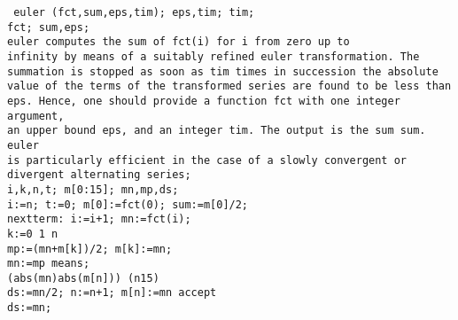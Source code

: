 \documentclass[a4paper,11pt]{article}
\begin{document}
\begin{flushleft}
\texttt{ euler (fct,sum,eps,tim);  eps,tim;  tim;\\
  fct;  sum,eps;\\
 euler computes the sum of fct(i) for i from zero up to\\
infinity by means of a suitably refined euler transformation. The\\
summation is stopped as soon as tim times in succession the absolute\\
value of the terms of the transformed series are found to be less than\\
eps. Hence, one should provide a function fct with one integer argument,\\
an upper bound eps, and an integer tim. The output is the sum sum. euler\\
is particularly efficient in the case of a slowly convergent or\\
divergent alternating series;\\
  i,k,n,t;  m[0:15];  mn,mp,ds;\\
i:=n; t:=0; m[0]:=fct(0); sum:=m[0]/2;\\
nextterm: i:=i+1; mn:=fct(i);\\
\hspace{1.0cm} k:=0  1  n \\
\hspace{1.0cm}\hspace{1.0cm}\hspace{1.0cm} mp:=(mn+m[k])/2; m[k]:=mn;\\
\hspace{1.0cm}\hspace{1.0cm}\hspace{1.0cm}\hspace{1.0cm}mn:=mp  means;\\
\hspace{1.0cm}\hspace{1.0cm} (abs(mn)\mlt{}abs(m[n])) \mland{} (n\mlt{}15) \\
\hspace{1.0cm}\hspace{1.0cm}\hspace{1.0cm} ds:=mn/2; n:=n+1; m[n]:=mn  accept\\
\hspace{1.0cm}\hspace{1.0cm} ds:=mn;\\
}
\end{flushleft}
\end{document}
